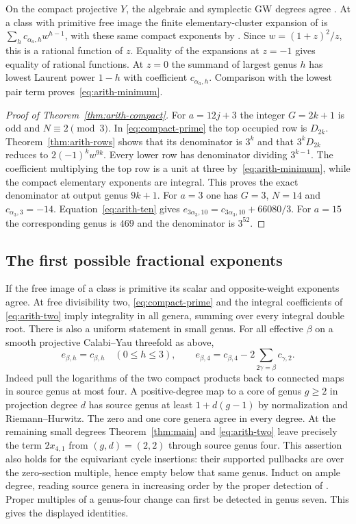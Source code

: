 On the compact projective $Y$, the algebraic and symplectic GW degrees
agree \cite{Siebert}. At a class with primitive free image the finite
elementary-cluster expansion of \cite{IP,DIW} is
$\sum_h c_{\alpha_a,h}w^{h-1}$, with these same compact exponents by
\cite[Theorem~1.1]{WueProduct}. Since $w=(1+z)^2/z$, this is a rational
function of $z$. Equality of the expansions at $z=-1$ gives equality
of rational functions. At $z=0$ the summand of largest genus $h$ has
lowest Laurent power $1-h$ with coefficient $c_{\alpha_a,h}$.
Comparison with the lowest pair term proves~\eqref{eq:arith-minimum}.

\begin{proof}[Proof of Theorem~\ref{thm:arith-compact}]
For $a=12j+3$ the integer $G=2k+1$ is odd and $N\equiv2\pmod3$.
In \eqref{eq:compact-prime} the top occupied row is $D_{2k}$.
Theorem~\ref{thm:arith-rows} shows that its denominator is $3^k$ and
that $3^kD_{2k}$ reduces to $2(-1)^kw^{9k}$. Every lower row has
denominator dividing $3^{k-1}$. The coefficient multiplying the top
row is a unit at three by~\eqref{eq:arith-minimum}, while the
compact elementary exponents are integral. This proves the exact
denominator at output genus $9k+1$. For $a=3$ one has $G=3$, $N=14$
and $c_{\alpha_3,3}=-14$. Equation~\eqref{eq:arith-ten} gives
$e_{3\alpha_3,10}=c_{3\alpha_3,10}+66080/3$. For $a=15$ the
corresponding genus is $469$ and the denominator is $3^{52}$.
\end{proof}

\subsection{The first possible fractional exponents}
If the free image of a class is primitive its scalar and opposite-weight
exponents agree. At free divisibility two, \eqref{eq:compact-prime}
and the integral coefficients of \eqref{eq:arith-two} imply
integrality in all genera, summing over every integral double root.
There is also a uniform statement in small genus. For all effective
$\beta$ on a smooth projective Calabi--Yau threefold as above,
\[
 e_{\beta,h}=c_{\beta,h}\quad(0\le h\le3),\qquad
 e_{\beta,4}=c_{\beta,4}-2\sum_{2\gamma=\beta}c_{\gamma,2}.
\]
Indeed pull the logarithms of the two compact products back to
connected maps in source genus at most four. A positive-degree
map to a core of genus $g\ge2$ in projection degree $d$ has source
genus at least $1+d(g-1)$ by normalization and Riemann--Hurwitz.
The zero and one core genera agree in every degree. At the remaining
small degrees Theorem~\ref{thm:main} and \eqref{eq:arith-two} leave
precisely the term $2x_{4,1}$ from $(g,d)=(2,2)$ through source genus
four. This assertion also holds for the equivariant cycle insertions:
their supported pullbacks are over the zero-section multiple, hence
empty below that same genus. Induct on ample degree, reading source
genera in increasing order by the proper detection of
\cite[Sections~5--6]{WueProduct}. Proper multiples of a genus-four change
can first be detected in genus seven. This gives the displayed identities.

